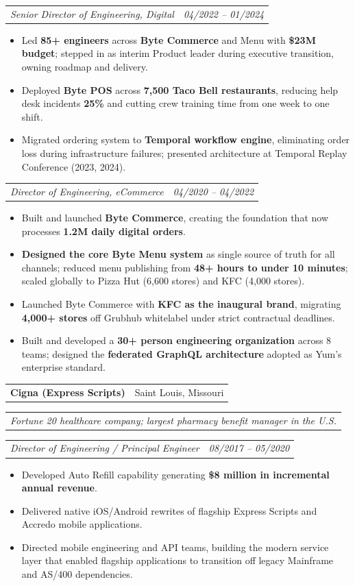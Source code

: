 \documentclass[letterpaper,11pt]{article}
\makeatletter
\newcommand{\resumeItem}[1]{
  \item\small{#1}
}
\newcommand{\resumeCompanyHeader}[2]{
  \vspace{-2pt}\item
    \begin{tabular*}{0.97\textwidth}[t]{l@{\extracolsep{\fill}}r}
      \textbf{#1} & #2 \\
    \end{tabular*}\vspace{-2pt}
}
\newcommand{\resumeCompanyDesc}[1]{
    \vspace{1pt}
    \begin{tabular*}{0.97\textwidth}{l}
      \textit{\small#1} \\
    \end{tabular*}\vspace{-3pt}
}
\newcommand{\resumeRole}[2]{
    \vspace{4pt}
    \begin{tabular*}{0.97\textwidth}{l@{\extracolsep{\fill}}r}
      \textit{\small#1} & \textit{\small #2} \\
    \end{tabular*}\vspace{-5pt}
}
\newcommand{\resumeItemListStart}{\begin{itemize}}
\newcommand{\resumeItemListEnd}{\end{itemize}\vspace{-5pt}}
\makeatother
\begin{document}
    \resumeRole{Senior Director of Engineering, Digital}{04/2022 -- 01/2024}
     \resumeItemListStart
        \resumeItem{Led \textbf{85+ engineers} across \textbf{Byte Commerce} and Menu with \textbf{\$23M budget}; stepped in as interim Product leader during executive transition, owning roadmap and delivery.}
        \resumeItem{Deployed \textbf{Byte POS} across \textbf{7,500 Taco Bell restaurants}, reducing help desk incidents \textbf{25\%} and cutting crew training time from one week to one shift.}
        \resumeItem{Migrated ordering system to \textbf{Temporal workflow engine}, eliminating order loss during infrastructure failures; presented architecture at Temporal Replay Conference (2023, 2024).}
     \resumeItemListEnd

    \resumeRole{Director of Engineering, eCommerce}{04/2020 -- 04/2022}
     \resumeItemListStart
        \resumeItem{Built and launched \textbf{Byte Commerce}, creating the foundation that now processes \textbf{1.2M daily digital orders}.}
        \resumeItem{\textbf{Designed the core Byte Menu system} as single source of truth for all channels; reduced menu publishing from \textbf{48+ hours to under 10 minutes}; scaled globally to Pizza Hut (6,600 stores) and KFC (4,000 stores).}
        \resumeItem{Launched Byte Commerce with \textbf{KFC as the inaugural brand}, migrating \textbf{4,000+ stores} off Grubhub whitelabel under strict contractual deadlines.}
        \resumeItem{Built and developed a \textbf{30+ person engineering organization} across 8 teams; designed the \textbf{federated GraphQL architecture} adopted as Yum's enterprise standard.}
     \resumeItemListEnd

    \resumeCompanyHeader{Cigna (Express Scripts)}{Saint Louis, Missouri}
    \resumeCompanyDesc{Fortune 20 healthcare company; largest pharmacy benefit manager in the U.S.}
    
    \resumeRole{Director of Engineering / Principal Engineer}{08/2017 -- 05/2020}
      \resumeItemListStart
        \resumeItem{Developed Auto Refill capability generating \textbf{\$8 million in incremental annual revenue}.}
        \resumeItem{Delivered native iOS/Android rewrites of flagship Express Scripts and Accredo mobile applications.}
        \resumeItem{Directed mobile engineering and API teams, building the modern service layer that enabled flagship applications to transition off legacy Mainframe and AS/400 dependencies.}
      \resumeItemListEnd
\end{document}
